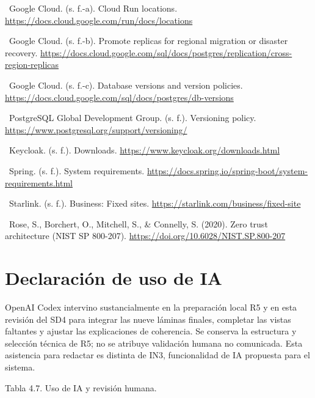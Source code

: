 \documentclass[11pt,letterpaper]{report}
\begin{document}
\noindent\textbullet\ Google Cloud. (s. f.-a). Cloud Run locations. \url{https://docs.cloud.google.com/run/docs/locations}\par
\noindent\textbullet\ Google Cloud. (s. f.-b). Promote replicas for regional migration or disaster recovery. \url{https://docs.cloud.google.com/sql/docs/postgres/replication/cross-region-replicas}\par
\noindent\textbullet\ Google Cloud. (s. f.-c). Database versions and version policies. \url{https://docs.cloud.google.com/sql/docs/postgres/db-versions}\par
\noindent\textbullet\ PostgreSQL Global Development Group. (s. f.). Versioning policy. \url{https://www.postgresql.org/support/versioning/}\par
\noindent\textbullet\ Keycloak. (s. f.). Downloads. \url{https://www.keycloak.org/downloads.html}\par
\noindent\textbullet\ Spring. (s. f.). System requirements. \url{https://docs.spring.io/spring-boot/system-requirements.html}\par
\noindent\textbullet\ Starlink. (s. f.). Business: Fixed sites. \url{https://starlink.com/business/fixed-site}\par
\noindent\textbullet\ Rose, S., Borchert, O., Mitchell, S., \& Connelly, S. (2020). Zero trust architecture (NIST SP 800-207). \url{https://doi.org/10.6028/NIST.SP.800-207}\par
\section*{Declaración de uso de IA}
OpenAI Codex intervino sustancialmente en la preparación local R5 y en esta revisión del SD4 para integrar las nueve láminas finales, completar las vistas faltantes y ajustar las explicaciones de coherencia. Se conserva la estructura y selección técnica de R5; no se atribuye validación humana no comunicada. Esta asistencia para redactar es distinta de IN3, funcionalidad de IA propuesta para el sistema.

Tabla 4.7. Uso de IA y revisión humana.
\end{document}
